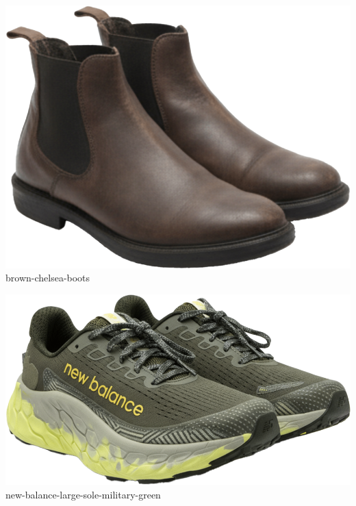\documentclass[10pt]{article}
\begin{document}
\begin{minipage}[t]{0.22\textwidth}\centering\vspace{0mm}
\includegraphics[width=\linewidth,keepaspectratio]{assets/shoes/brown-chelsea-boots.png}\\
\vspace{0.5mm}\tiny brown-chelsea-boots\end{minipage}
\begin{minipage}[t]{0.22\textwidth}\centering\vspace{0mm}
\includegraphics[width=\linewidth,keepaspectratio]{assets/shoes/new-balance-large-sole-military-green.png}\\
\vspace{0.5mm}\tiny new-balance-large-sole-military-green\end{minipage}
\end{document}
